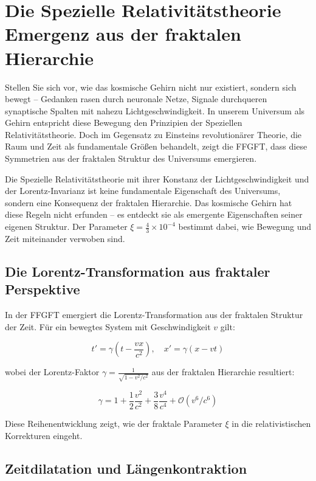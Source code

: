 \chapter{Die Spezielle Relativitätstheorie Emergenz aus der fraktalen Hierarchie}



Stellen Sie sich vor, wie das kosmische Gehirn nicht nur existiert, sondern sich bewegt -- Gedanken rasen durch neuronale Netze, Signale durchqueren synaptische Spalten mit nahezu Lichtgeschwindigkeit. In unserem Universum als Gehirn entspricht diese Bewegung den Prinzipien der Speziellen Relativitätstheorie. Doch im Gegensatz zu Einsteins revolutionärer Theorie, die Raum und Zeit als fundamentale Größen behandelt, zeigt die FFGFT, dass diese Symmetrien aus der fraktalen Struktur des Universums emergieren.

Die Spezielle Relativitätstheorie mit ihrer Konstanz der Lichtgeschwindigkeit und der Lorentz-Invarianz ist keine fundamentale Eigenschaft des Universums, sondern eine Konsequenz der fraktalen Hierarchie. Das kosmische Gehirn hat diese Regeln nicht erfunden -- es entdeckt sie als emergente Eigenschaften seiner eigenen Struktur. Der Parameter $\xi = \frac{4}{3} \times 10^{-4}$ bestimmt dabei, wie Bewegung und Zeit miteinander verwoben sind.

\section{Die Lorentz-Transformation aus fraktaler Perspektive}

In der FFGFT emergiert die Lorentz-Transformation aus der fraktalen Struktur der Zeit. Für ein bewegtes System mit Geschwindigkeit $v$ gilt:

\begin{equation}
t' = \gamma(t - \frac{vx}{c^2}), \quad x' = \gamma(x - vt)
\end{equation}

wobei der Lorentz-Faktor $\gamma = \frac{1}{\sqrt{1 - v^2/c^2}}$ aus der fraktalen Hierarchie resultiert:

\begin{equation}
\gamma = 1 + \frac{1}{2}\frac{v^2}{c^2} + \frac{3}{8}\frac{v^4}{c^4} + \mathcal{O}(v^6/c^6)
\end{equation}

Diese Reihenentwicklung zeigt, wie der fraktale Parameter $\xi$ in die relativistischen Korrekturen eingeht.

\section{Zeitdilatation und Längenkontraktion}

